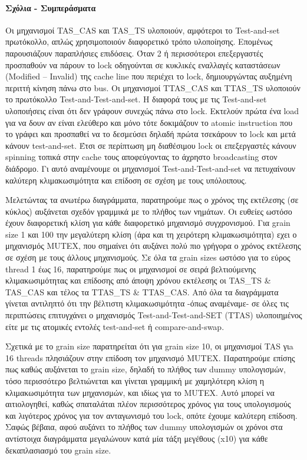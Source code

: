 \paragraph{Σχόλια - Συμπεράσματα}
Οι μηχανισμοί TAS\_CAS και TAS\_TS υλοποιούν, αμφότεροι το Test-and-set
πρωτόκολλο, απλώς χρησιμοποιούν διαφορετικό τρόπο υλοποίησης. Επομένως
παρουσιάζουν παραπλήσιες επιδόσεις. Όταν 2 ή περισσότεροι επεξεργαστές
προσπαθούν να πάρουν το lock οδηγούνται σε κυκλικές εναλλαγές καταστάσεων
(Modified – Invalid) της cache line που περιέχει το lock, δημιουργώντας αυξημένη
περιττή κίνηση πάνω στο bus. Οι μηχανισμοί TTAS\_CAS και TTAS\_TS υλοποιούν το
πρωτόκολλο Test-and-Test-and-set. Η διαφορά τους με τις Test-and-set υλοποιήσεις
είναι ότι δεν γράφουν συνεχώς πάνω στο lock. Εκτελούν πρώτα ένα load για να δουν
αν είναι ελεύθερο και μόνο τότε δοκιμάζουν το atomic instruction που το γράφει
και προσπαθεί να το δεσμεύσει δηλαδή πρώτα τσεκάρουν το lock και μετά κάνουν
test-and-set. Έτσι σε περίπτωση μη διαθέσιμου lock οι επεξεργαστές κάνουν
spinning τοπικά στην cache τους αποφεύγοντας το άχρηστο broadcasting στον
διάδρομο. Γι αυτό αναμένουμε οι μηχανισμοί Test-and-Test-and-set να πετυχαίνουν καλύτερη
κλιμακωσιμότητα και επίδοση σε σχέση με τους υπόλοιπους.

Μελετώντας τα ανωτέρω διαγράμματα, παρατηρούμε πως ο χρόνος της εκτέλεσης (σε κύκλος) αυξάνεται  σχεδόν γραμμικά με
το πλήθος των νημάτων. Οι ευθείες ωστόσο έχουν διαφορετική κλίση για κάθε
διαφορετικό μηχανισμό συγχρονισμού. Για grain size 1 και 100 την μεγαλύτερη
κλίση (άρα και τη χειρότερη κλιμακωσιμότητα) εχει ο μηχανισμός MUTEX, που
σημαίνει ότι αυξάνει πολύ πιο γρήγορα ο χρόνος εκτέλεσης σε σχέση με τους άλλους
μηχανισμούς. Σε όλα τα grain sizes ωστόσο για το εύρος thread 1 έως 16,
παρατηρούμε πως οι μηχανισμοί σε σειρά βελτιούμενης κλιμακωσιμότητας και
επίδοσης από άποψη χρόνου εκτέλεσης  οι TAS\_TS \& TAS\_CAS και τέλος τα TTAS\_TS
\& TTAS\_CAS. Από όλα τα διαγράμματα γίνεται αντιληπτό ότι την βέλτιστη
κλιμακωσιμότητα -όπως αναμέναμε- σε όλες τις περιπτώσεις επιτυγχάνει ο μηχανισμός
Test-and-Test-and-SET (TTAS) υλοποιημένος είτε με τις ατομικές εντολές
test-and-set ή compare-and-swap.

Σχετικά με το grain size παρατηρείται ότι για grain size 10, οι μηχανισμοί TAS
γιa 16 threads πλησιάζουν στην επίδοση τον μηχανισμό MUTEX. Παρατηρούμε επίσης
πως καθώς αυξάνεται το grain size, δηλαδή το πλήθος των dummy υπολογισμών, τόσο
περισσότερο βελτιώνεται και γίνεται γραμμική με χαμηλότερη κλίση η
κλιμακωσιμότητα των μηχανισμών, και ιδίως για το MUTEX. Αυτό μπορεί να
αιτιολογηθεί, καθώς σπαταλάται πλέον περισσότερος χρόνος για τους υπολογισμούς
και λιγότερος χρόνος για τον ανταγωνισμό του lock, οπότε έχουμε καλύτερη
επίδοση. Σαφώς βέβαια, αφού αυξάνει το πλήθος των dummy υπολογισμών οι χρόνοι
στα αντίστοιχα διαγράμματα μεγαλώνουν κατά μία τάξη μεγέθους (x10) για κάθε
δεκαπλασιασμό του grain size.